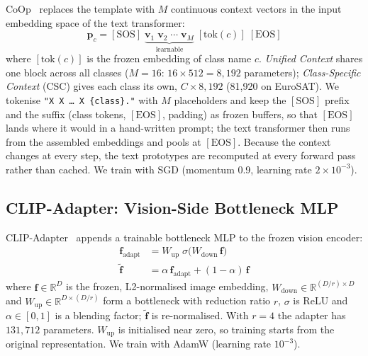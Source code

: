 \documentclass[10pt,twocolumn,letterpaper]{article}
\begin{document}
CoOp~\cite{zhou2022learning} replaces the template with $M$ continuous
context vectors in the input embedding space of the text transformer:
\begin{equation}\label{eq:coop}
  \mathbf{p}_c = [\mathrm{SOS}]\;
  \underbrace{\mathbf{v}_1\;\mathbf{v}_2\;\cdots\;\mathbf{v}_M}_{\text{learnable}}
  \;[\mathrm{tok}(c)]\;[\mathrm{EOS}]
\end{equation}
where $[\mathrm{tok}(c)]$ is the frozen embedding of class name $c$.
\emph{Unified Context} shares one block across all classes ($M{=}16$:
$16 \times 512 = 8{,}192$ parameters); \emph{Class-Specific Context} (CSC)
gives each class its own, $C \times 8{,}192$ (81{,}920 on EuroSAT).  We
tokenise \texttt{"X X \ldots\ X \{class\}."} with $M$ placeholders and
keep the $[\mathrm{SOS}]$ prefix and the suffix (class tokens,
$[\mathrm{EOS}]$, padding) as frozen buffers, so that $[\mathrm{EOS}]$
lands where it would in a hand-written prompt; the text transformer then
runs from the assembled embeddings and pools at $[\mathrm{EOS}]$.  Because
the context changes at every step, the text prototypes are recomputed at
every forward pass rather than cached.  We train with SGD (momentum 0.9,
learning rate $2 \times 10^{-3}$).

\subsection{CLIP-Adapter: Vision-Side Bottleneck MLP}\label{sec:adapter}

CLIP-Adapter~\cite{gao2024clipadapter} appends a trainable bottleneck MLP
to the frozen vision encoder:
\begin{align}
  \mathbf{f}_{\mathrm{adapt}} &= W_{\mathrm{up}} \;\sigma\bigl(
    W_{\mathrm{down}}\,\mathbf{f}\bigr) \label{eq:adapter-mlp}\\
  \tilde{\mathbf{f}} &= \alpha\,\mathbf{f}_{\mathrm{adapt}}
    + (1-\alpha)\,\mathbf{f} \label{eq:adapter-blend}
\end{align}
where $\mathbf{f} \in \mathbb{R}^D$ is the frozen, L2-normalised image
embedding, $W_{\mathrm{down}} \in \mathbb{R}^{(D/r) \times D}$ and
$W_{\mathrm{up}} \in \mathbb{R}^{D \times (D/r)}$ form a bottleneck with
reduction ratio $r$, $\sigma$ is ReLU and $\alpha \in [0, 1]$ is a
blending factor; $\tilde{\mathbf{f}}$ is re-normalised.  With $r = 4$ the
adapter has $131{,}712$ parameters.  $W_{\mathrm{up}}$ is initialised near
zero, so training starts from the original representation.  We train with
AdamW (learning rate $10^{-3}$).
\end{document}
